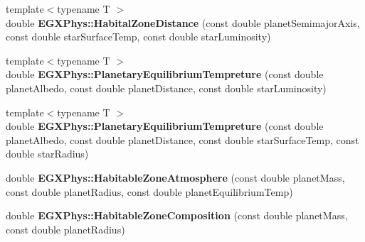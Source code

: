 \begin{DoxyCompactItemize}
{\footnotesize template$<$typename T $>$ }\\double {\bfseries E\+G\+X\+Phys\+::\+Habital\+Zone\+Distance} (const double planet\+Semimajor\+Axis, const double star\+Surface\+Temp, const double star\+Luminosity)
\item 
\mbox{\label{group___astrophysics_gaa428f551c34387a00d6c376b3f33632b}} 
{\footnotesize template$<$typename T $>$ }\\double {\bfseries E\+G\+X\+Phys\+::\+Planetary\+Equilibrium\+Tempreture} (const double planet\+Albedo, const double planet\+Distance, const double star\+Luminosity)
\item 
\mbox{\label{group___astrophysics_ga387b915a2eb48bda3fe8bfc369bb564c}} 
{\footnotesize template$<$typename T $>$ }\\double {\bfseries E\+G\+X\+Phys\+::\+Planetary\+Equilibrium\+Tempreture} (const double planet\+Albedo, const double planet\+Distance, const double star\+Surface\+Temp, const double star\+Radius)
\item 
\mbox{\label{group___astrophysics_ga9829bd56a145bd0ef17b38c6f8006f66}} 
double {\bfseries E\+G\+X\+Phys\+::\+Habitable\+Zone\+Atmosphere} (const double planet\+Mass, const double planet\+Radius, const double planet\+Equilibrium\+Temp)
\item 
\mbox{\label{group___astrophysics_ga216592494ebf26b017c36af156c4d14b}} 
double {\bfseries E\+G\+X\+Phys\+::\+Habitable\+Zone\+Composition} (const double planet\+Mass, const double planet\+Radius)
\end{DoxyCompactItemize}
